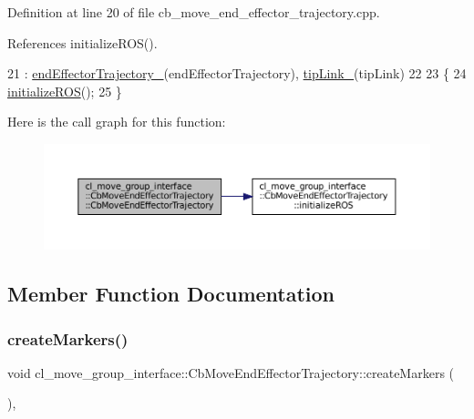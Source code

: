 Definition at line 20 of file cb\+\_\+move\+\_\+end\+\_\+effector\+\_\+trajectory.\+cpp.



References initialize\+R\+O\+S().


\begin{DoxyCode}
21         : \hyperlink{classcl__move__group__interface_1_1CbMoveEndEffectorTrajectory_ae13dfd31ea3660646e03882f0c2c29f0}{endEffectorTrajectory\_}(endEffectorTrajectory), 
      \hyperlink{classcl__move__group__interface_1_1CbMoveEndEffectorTrajectory_a24c6c30b9b0761a61fa002d947bd3e11}{tipLink\_}(tipLink)
22 
23     \{
24         \hyperlink{classcl__move__group__interface_1_1CbMoveEndEffectorTrajectory_afcee8f3853a5cef8806137a304c8a14b}{initializeROS}();
25     \}
\end{DoxyCode}
Here is the call graph for this function\+:
\nopagebreak
\begin{figure}[H]
\begin{center}
\leavevmode
\includegraphics[width=350pt]{classcl__move__group__interface_1_1CbMoveEndEffectorTrajectory_ae6985de3f8f0e1ec7dea88c1e551889a_cgraph}
\end{center}
\end{figure}


\subsection{Member Function Documentation}
\mbox{\label{classcl__move__group__interface_1_1CbMoveEndEffectorTrajectory_a442efa1d5bc9e9a16f74ecd31b13d9b5}} 
\subsubsection{\texorpdfstring{create\+Markers()}{createMarkers()}}
{\footnotesize\ttfamily void cl\+\_\+move\+\_\+group\+\_\+interface\+::\+Cb\+Move\+End\+Effector\+Trajectory\+::create\+Markers (\begin{DoxyParamCaption}{ }\end{DoxyParamCaption})\hspace{0.3cm}{\ttfamily [protected]}, {\ttfamily [virtual]}}




